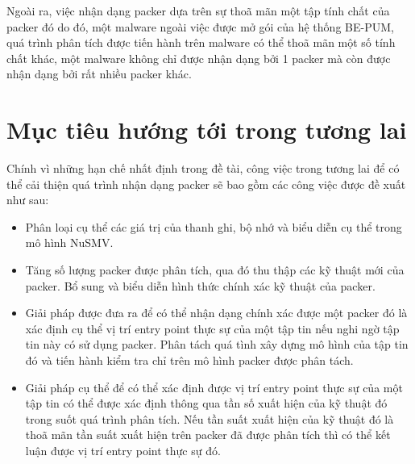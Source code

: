 \hspace{0.5cm}Ngoài ra, việc nhận dạng packer dựa trên sự thoã mãn một tập tính chất của packer đó do đó, một malware ngoài việc được mở gói của hệ thống BE-PUM, quá trình phân tích được tiến hành trên malware có thể thoã mãn một số tính chất khác, một malware không chỉ được nhận dạng bởi 1 packer mà còn được nhận dạng bởi rất nhiều packer khác.

\section{Mục tiêu hướng tới trong tương lai}

\hspace{0.5cm}Chính vì những hạn chế nhất định trong đề tài, công việc trong tương lai để có thể cải thiện quá trình nhận dạng packer sẽ bao gồm các công việc được đề xuất như sau:

\begin{itemize}
\item{Phân loại cụ thể các giá trị của thanh ghi, bộ nhớ và biểu diễn cụ thể trong mô hình NuSMV.\\}
\item{Tăng số lượng packer được phân tích, qua đó thu thập các kỹ thuật mới của packer. Bổ sung và biểu diễn hình thức chính xác kỹ thuật của packer.\\}
\item{Giải pháp được đưa ra để có thể nhận dạng chính xác được một packer đó là xác định cụ thể vị trí entry point thực sự của một tập tin nếu nghi ngờ tập tin này có sử dụng packer. Phân tách quá tình xây dựng mô hình của tập tin đó và tiến hành kiểm tra chỉ trên mô hình packer được phân tách.\\}
\item{Giải pháp cụ thể để có thể xác định được vị trí entry point thực sự của một tập tin có thể được xác định thông qua tần số xuất hiện của kỹ thuật đó trong suốt quá trình phân tích. Nếu tần suất xuất hiện của kỹ thuật đó là thoã mãn tần suất xuất hiện trên packer đã được phân tích thì có thể kết luận được vị trí entry point thực sự đó.}
\end{itemize}

